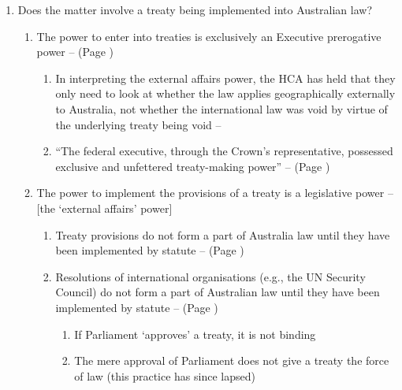 \begin{enumerate}
\begin{enumerate}
\begin{enumerate}
        \end{enumerate}
    \end{enumerate}
    \item Does the matter involve a treaty being implemented into Australian law?
    \begin{enumerate}
        \item \label{treaty entry executive power} The power to enter into treaties is exclusively an Executive prerogative power --  (Page \pageref{Constitution s 61})
        \begin{enumerate}
            \item In interpreting the external affairs power, the HCA has held that they only need to look at whether the law applies geographically externally to Australia, not whether the international law was void by virtue of the underlying treaty being void -- 
            \item ``The federal executive, through the Crown's representative, possessed exclusive and unfettered treaty-making power'' --  (Page \pageref{case:Koowarta v Bjelke-Petersen})
        \end{enumerate}
        \item \label{treaty legislature powers} The power to implement the provisions of a treaty is a legislative power --  [the `external affairs' power]
        \begin{enumerate}
            \item Treaty provisions do not form a part of Australia law until they have been implemented by statute --  (Page \pageref{case: Dietrich v R})
            \item Resolutions of international organisations (e.g., the UN Security Council) do not form a part of Australian law until they have been implemented by statute --  (Page \pageref{case:Bradley v Commonwealth})
            \begin{enumerate}
                \item If Parliament `approves' a treaty, it is not binding
                \item The mere approval of Parliament does not give a treaty the force of law (this practice has since lapsed)

\end{enumerate}
\end{enumerate}
\end{enumerate}
\end{enumerate}
